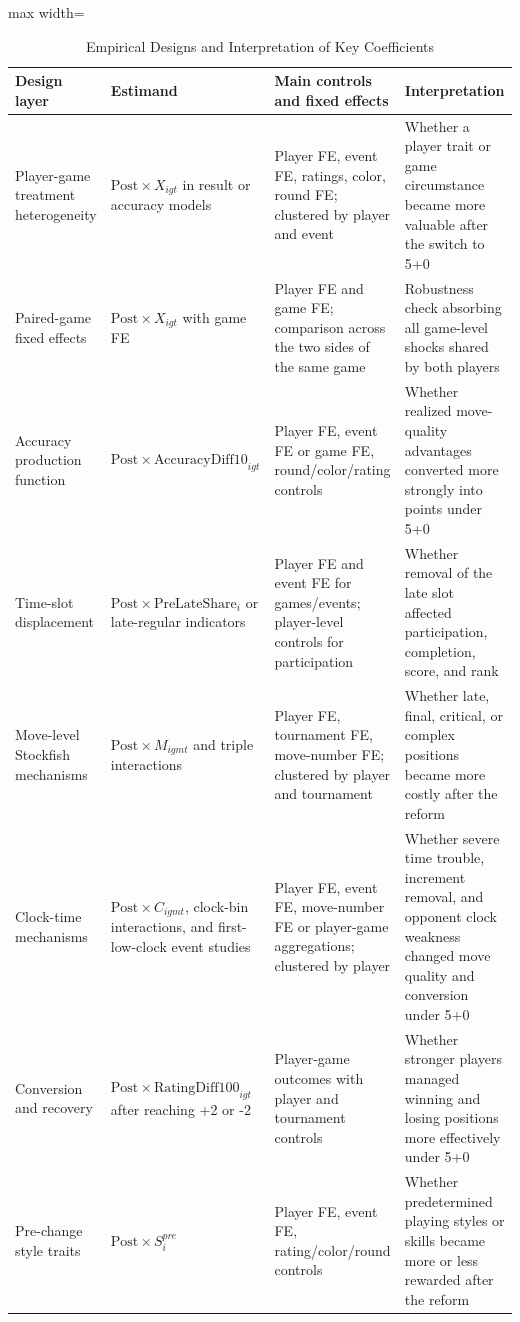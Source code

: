 \begin{table}[H]
\centering
\caption{Empirical Designs and Interpretation of Key Coefficients}
\label{tab:empirical-design-catalog}
\small
\begin{adjustbox}{max width=\textwidth}
\begin{tabular}{p{} p{} p{} p{}}
\toprule
Design layer & Estimand & Main controls and fixed effects & Interpretation \\
\midrule
Player-game treatment heterogeneity & \(\text{Post} \times X_{igt}\) in result or accuracy models & Player FE, event FE, ratings, color, round FE; clustered by player and event & Whether a player trait or game circumstance became more valuable after the switch to 5+0 \\
Paired-game fixed effects & \(\text{Post} \times X_{igt}\) with game FE & Player FE and game FE; comparison across the two sides of the same game & Robustness check absorbing all game-level shocks shared by both players \\
Accuracy production function & \(\text{Post} \times \text{AccuracyDiff10}_{igt}\) & Player FE, event FE or game FE, round/color/rating controls & Whether realized move-quality advantages converted more strongly into points under 5+0 \\
Time-slot displacement & \(\text{Post} \times \text{PreLateShare}_{i}\) or late-regular indicators & Player FE and event FE for games/events; player-level controls for participation & Whether removal of the late slot affected participation, completion, score, and rank \\
Move-level Stockfish mechanisms & \(\text{Post} \times M_{igmt}\) and triple interactions & Player FE, tournament FE, move-number FE; clustered by player and tournament & Whether late, final, critical, or complex positions became more costly after the reform \\
Clock-time mechanisms & \(\text{Post} \times C_{igmt}\), clock-bin interactions, and first-low-clock event studies & Player FE, event FE, move-number FE or player-game aggregations; clustered by player & Whether severe time trouble, increment removal, and opponent clock weakness changed move quality and conversion under 5+0 \\
Conversion and recovery & \(\text{Post} \times \text{RatingDiff100}_{igt}\) after reaching +2 or -2 & Player-game outcomes with player and tournament controls & Whether stronger players managed winning and losing positions more effectively under 5+0 \\
Pre-change style traits & \(\text{Post} \times S_i^{pre}\) & Player FE, event FE, rating/color/round controls & Whether predetermined playing styles or skills became more or less rewarded after the reform \\
\bottomrule
\end{tabular}
\end{adjustbox}
\end{table}
